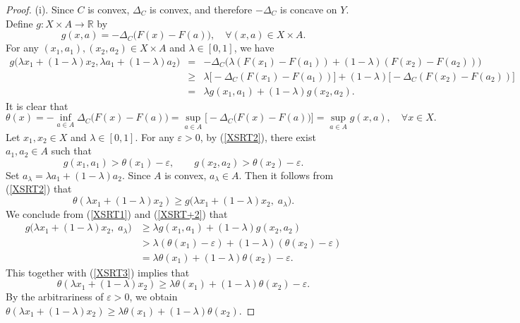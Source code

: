 \documentclass[10pt,a4paper]{amsart}
\begin{document}
\begin{proof}
	(i). Since $C$ is convex, $\Delta_C$ is convex, and therefore $-\Delta_C$ is concave on $Y$. Define $g: X\times A \to \mathbb{R}$ by
	\[
	g(x,a) = -\Delta_C\big(F(x)-F(a)\big),  \quad  \forall  (x,a)  \in  X\times A.
	\]
	For any $(x_1,a_1),(x_2,a_2) \in X\times A$ and $\lambda\in[0,1]$, we have
	\begin{eqnarray} \label{XSRT1}
		g\bigl( \lambda x_1 + (1-\lambda)x_2, \lambda a_1 + (1-\lambda)a_2 \bigr)
		&=& -\Delta_C\big( \lambda(F(x_1)-F(a_1)) + (1-\lambda)(F(x_2)-F(a_2)) \big) \nonumber\\ 
		&\ge& \lambda\big[-\Delta_C(F(x_1)-F(a_1))\big] + (1-\lambda)\big[-\Delta_C(F(x_2)-F(a_2))\big] \nonumber\\ 
		&=& \lambda g(x_1,a_1) + (1-\lambda)g(x_2,a_2).  
\end{eqnarray}
It is clear that
	\begin{equation} \label{XSRT2}
		\theta(x) = -\inf_{a\in A} \Delta_C\big(F(x)-F(a)\big)
		= \sup_{a\in A} \Big[-\Delta_C\big(F(x)-F(a)\big)\Big]
		= \sup_{a\in A} g(x,a), \quad \forall x \in X.  
	\end{equation}
Let $x_1, x_2 \in X$ and $\lambda\in[0,1]$.
	For any $\varepsilon>0$, by (\ref{XSRT2}), there exist $a_1,a_2\in A$ such that
\begin{equation} \label{XSRT+2}
	g(x_1,a_1) > \theta(x_1) - \varepsilon, \qquad g(x_2,a_2) > \theta(x_2) - \varepsilon.
\end{equation}
	Set $a_\lambda = \lambda a_1 + (1-\lambda)a_2$. Since $A$ is convex, $a_\lambda \in A$. Then  it follows from  (\ref{XSRT2})  that
\begin{equation} \label{XSRT3}
	\theta(\lambda x_1 + (1-\lambda)x_2) \ge g\big(\lambda x_1 + (1-\lambda)x_2,\; a_\lambda\big).
	\end{equation}
    We conclude from  (\ref{XSRT1})  and  (\ref{XSRT+2})  that
	\[
	\begin{aligned}
		g\big(\lambda x_1 + (1-\lambda)x_2,\; a_\lambda\big)
		&\ge \lambda g(x_1,a_1) + (1-\lambda)g(x_2,a_2) \\
		&> \lambda(\theta(x_1)-\varepsilon) + (1-\lambda)(\theta(x_2)-\varepsilon) \\
		&= \lambda\theta(x_1) + (1-\lambda)\theta(x_2) - \varepsilon.
	\end{aligned}
	\]
	  This together with   (\ref{XSRT3})  implies that 
	\[
	\theta(\lambda x_1 + (1-\lambda)x_2) \ge \lambda\theta(x_1) + (1-\lambda)\theta(x_2) - \varepsilon.
	\]
	By the arbitrariness of $\varepsilon>0$, we obtain
$
	\theta(\lambda x_1 + (1-\lambda)x_2) \ge \lambda\theta(x_1) + (1-\lambda)\theta(x_2).
$
	

\end{proof}
\end{document}
